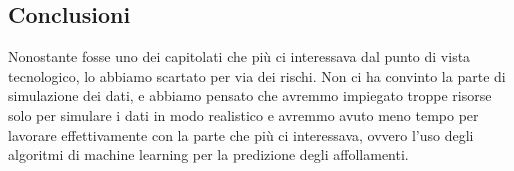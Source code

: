 \documentclass[../studio_di_fattibilita.tex]{subfiles}
\begin{document}
\subsection{Conclusioni}%
\label{sub:c3_conclusioni}
Nonostante fosse uno dei capitolati che più ci interessava dal punto di vista tecnologico, lo abbiamo scartato per via dei rischi. Non ci ha convinto la parte di simulazione dei dati, e abbiamo pensato che avremmo impiegato troppe risorse solo per simulare i dati in modo realistico e avremmo avuto meno tempo per lavorare effettivamente con la parte che più ci interessava, ovvero l’uso degli algoritmi di machine learning per la predizione degli affollamenti.
\end{document}
